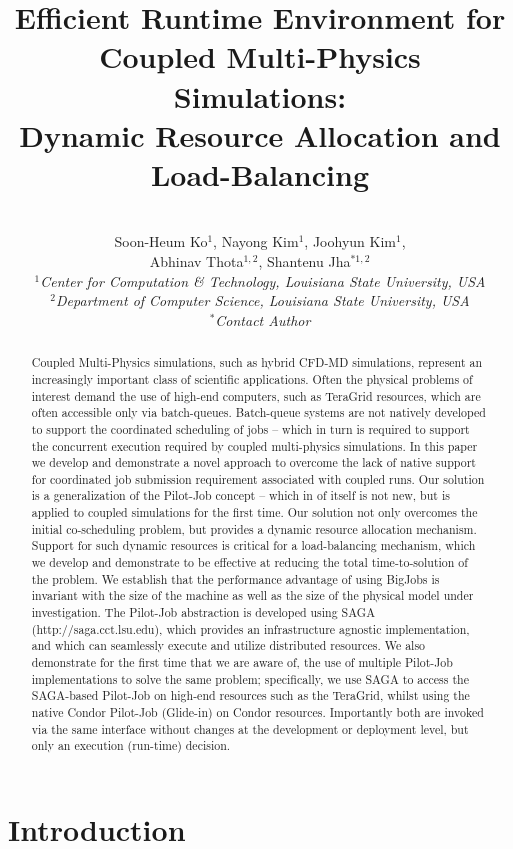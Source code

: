 \documentclass[conference,final]{IEEEtran}
\title{Efficient Runtime Environment for Coupled Multi-Physics Simulations: \\
Dynamic Resource Allocation and Load-Balancing}
\author{
 ~\\[-2em]
 Soon-Heum Ko$^{1}$, Nayong Kim$^{1}$, Joohyun Kim$^{1}$, \\ Abhinav Thota$^{1,2}$, Shantenu Jha$^{*1,2}$\\
 \small{\emph{$^{1}$Center for Computation \& Technology, Louisiana State University, USA}}\\
 \small{\emph{$^{2}$Department of Computer Science, Louisiana State University, USA}}\\
 \small{\emph{$^{*}$Contact Author}}\\
}
\newcommand{\up}{\vspace*{-1em}}
\begin{document}
\maketitle

\begin{abstract}
  Coupled Multi-Physics simulations, such as hybrid CFD-MD
  simulations, represent an increasingly important class of scientific
  applications.  Often the physical problems of interest demand the
  use of high-end computers, such as TeraGrid resources, which are
  often accessible only via batch-queues. Batch-queue systems are not
  natively developed to support the coordinated scheduling of jobs --
  which in turn is required to support the concurrent execution
  required by coupled multi-physics simulations. In this paper we
  develop and demonstrate a novel approach to overcome the lack of
  native support for coordinated job submission requirement associated
  with coupled runs. Our solution is a generalization of the Pilot-Job
  concept -- which in of itself is not new, but is applied to coupled
  simulations for the first time. Our solution not only overcomes the
  initial co-scheduling problem, but provides a dynamic resource
  allocation mechanism. Support for such dynamic resources is critical
  for a load-balancing mechanism, which we develop and demonstrate to
  be effective at reducing the total time-to-solution of the
  problem. We establish that the performance advantage of using
  BigJobs is invariant with the size of the machine as well as the
  size of the physical model under investigation.  The Pilot-Job
  abstraction is developed using SAGA (http://saga.cct.lsu.edu), which
  provides an infrastructure agnostic implementation, and which can
  seamlessly execute and utilize distributed resources. We also
  demonstrate for the first time that we are aware of, the use of
  multiple Pilot-Job implementations to solve the same problem;
  specifically, we use SAGA to access the SAGA-based Pilot-Job on
  high-end resources such as the TeraGrid, whilst using the native
  Condor Pilot-Job (Glide-in) on Condor resources. Importantly both
  are invoked via the same interface without changes at the
  development or deployment level, but only an execution (run-time)
  decision.
\end{abstract}
\up\up


\section{Introduction}
\end{document}
